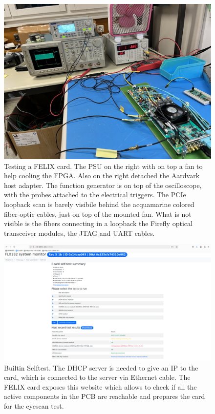 \begin{figure}[H]
\centering
\includegraphics[width=\textwidth]{images/contributions/felix-card-testing.jpg}
\caption[Visual aid of FELIX card testing]{Testing a FELIX card. The PSU on the right with on top a fan to help cooling the \acs{FPGA}. Also on the right detached the Aardvark host adapter. The function generator is on top of the oscilloscope, with the probes attached to the electrical triggers. The \acs{PCIe} loopback scan is barely visibile behind the acquamarine colored fiber-optic cables, just on top of the mounted fan. What is not visible is the fibers connecting in a loopback the Firefly \protect\cite{firefly-optical-transceiver} optical transceiver modules, the JTAG and UART cables.}
\label{fig:felix-testing}
\end{figure}

\begin{figure}[H]
\centering
\includegraphics[width=\textwidth]{images/contributions/BIST.png}
\caption[Builtin Selftest screenshot]{Builtin Selftest. The DHCP server is needed to give an IP to the card, which is connected to the server via Ethernet cable. The \acs{FELIX} card exposes this website which allows to check if all the active components in the \acs{PCB} are reachable and prepares the card for the eyescan test.}
\label{fig:bist}
\end{figure}


